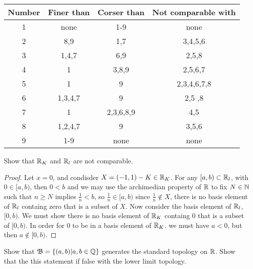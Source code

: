 \begin{center}
    \begin{tabular}{ |c|c|c|c| } 
     \hline
     Number & Finer than & Corser than& Not comparable with \\ 
     \hline
     1 & none & 1-9 & none \\ 
     \hline
     2 & 8,9 & 1,7 & 3,4,5,6 \\ 
     \hline
     3 &  1,4,7 & 6,9 & 2,5,8 \\ 
     \hline
     4 & 1 & 3,8,9 & 2,5,6,7 \\ 
     \hline
     5 & 1 & 9  & 2,3,4,6,7,8 \\ 
     \hline
     6 & 1,3,4,7 & 9  & 2,5 ,8\\ 
     \hline
     7 & 1 & 2,3,6,8,9  & 4,5 \\ 
     \hline
     8 & 1,2,4,7 & 9  & 3,5,6 \\ 
     \hline
     9 & 1-9 & none  & none \\
     \hline

    \end{tabular}
    \end{center}

\question
Show that $\mathbb{R}_K$ and $\mathbb{R}_l$ are not comparable. 

\begin{proof}
    Let $x = 0$, and condisder $X = (-1, 1) - K \in \mathbb{R}_K$. For any $[a ,b) \subset \mathbb{R}_l$, with $0 \in [a, b)$, then $0 < b$ and we may use the archimedian 
    property of $\mathbb{R}$ to fix $N \in \mathbb{N}$ such that $n \geq N$ implies $\frac{1}{n} < b$, so $\frac{1}{n} \in [a, b)$ since $\frac{1}{n} \notin X$, there is no 
    basis element of $\mathbb{R}_l$ containg zero that is a subset of $X$. Now consider the basis element of $\mathbb{R}_l$, $[0, b)$. We must show there is no 
    basis element of $\mathbb{R}_K$ containg $0$ that is a subset of $[0, b)$. In order for $0$ to be in a basis element of $\mathbb{R}_K$.
    we must have $a < 0$, but then $a \notin [0, b)$. 
\end{proof}

\question 
Show that $\mathfrak{B} = \{(a, b)| a, b \in \mathbb{Q}\}$ generates the standard topology on $\mathbb{R}$. Show that the this statement if false with the lower limit topology.

